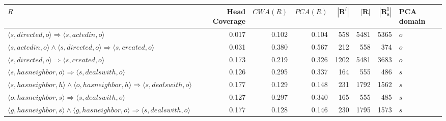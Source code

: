 \begin{tabular}{lrrrrrrl}
\toprule
                                                                                                                             $R$ &  Head Coverage &  $\textit{CWA}(R)$ &  $\textit{PCA}(R)$ &  $\left| \mathbf{R}^{l}\right|$ &  $\left| \mathbf{R}\right|$ &  $\left| \mathbf{R_s^l}\right|$ & PCA domain \\
\midrule
                                                     $\langle s, directed, o \rangle \Rightarrow \langle s, actedin , o \rangle$ &          0.017 &              0.102 &              0.104 &                             558 &                        5481 &                            5365 &        $o$ \\
                $\langle s, actedin, o \rangle \wedge \langle s, directed, o \rangle \Rightarrow \langle s, created , o \rangle$ &          0.031 &              0.380 &              0.567 &                             212 &                         558 &                             374 &        $o$ \\
                                                     $\langle s, directed, o \rangle \Rightarrow \langle s, created , o \rangle$ &          0.173 &              0.219 &              0.326 &                            1202 &                        5481 &                            3683 &        $o$ \\
                                                $\langle s, hasneighbor, o \rangle \Rightarrow \langle s, dealswith , o \rangle$ &          0.126 &              0.295 &              0.337 &                             164 &                         555 &                             486 &        $s$ \\
       $\langle s, hasneighbor, h \rangle \wedge \langle o, hasneighbor, h \rangle \Rightarrow \langle s, dealswith , o \rangle$ &          0.177 &              0.129 &              0.148 &                             231 &                        1792 &                            1562 &        $s$ \\
                                                $\langle o, hasneighbor, s \rangle \Rightarrow \langle s, dealswith , o \rangle$ &          0.127 &              0.297 &              0.340 &                             165 &                         555 &                             485 &        $s$ \\
       $\langle g, hasneighbor, s \rangle \wedge \langle g, hasneighbor, o \rangle \Rightarrow \langle s, dealswith , o \rangle$ &          0.177 &              0.128 &              0.146 &                             230 &                        1795 &                            1573 &        $s$ \\

\end{tabular}
